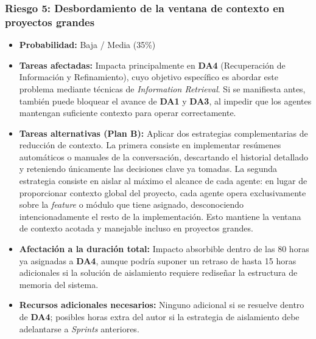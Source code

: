 \documentclass[11pt, letterpaper]{article}
\begin{document}
\subsubsection{Riesgo 5: Desbordamiento de la ventana de contexto en proyectos grandes}
\label{sec:riesgo5}
\begin{itemize}
    \item \textbf{Probabilidad:} Baja / Media (35\%)
    \item \textbf{Tareas afectadas:} Impacta principalmente en \textbf{DA4} (Recuperación de Información y Refinamiento), cuyo objetivo específico es abordar este problema mediante técnicas de \textit{Information Retrieval}. Si se manifiesta antes, también puede bloquear el avance de \textbf{DA1} y \textbf{DA3}, al impedir que los agentes mantengan suficiente contexto para operar correctamente.
    \item \textbf{Tareas alternativas (Plan B):} Aplicar dos estrategias complementarias de reducción de contexto. La primera consiste en implementar resúmenes automáticos o manuales de la conversación, descartando el historial detallado y reteniendo únicamente las decisiones clave ya tomadas. La segunda estrategia consiste en aislar al máximo el alcance de cada agente: en lugar de proporcionar contexto global del proyecto, cada agente opera exclusivamente sobre la \textit{feature} o módulo que tiene asignado, desconociendo intencionadamente el resto de la implementación. Esto mantiene la ventana de contexto acotada y manejable incluso en proyectos grandes.
    \item \textbf{Afectación a la duración total:} Impacto absorbible dentro de las 80 horas ya asignadas a \textbf{DA4}, aunque podría suponer un retraso de hasta 15 horas adicionales si la solución de aislamiento requiere rediseñar la estructura de memoria del sistema.
    \item \textbf{Recursos adicionales necesarios:} Ninguno adicional si se resuelve dentro de \textbf{DA4}; posibles horas extra del autor si la estrategia de aislamiento debe adelantarse a \textit{Sprints} anteriores.
\end{itemize}
\end{document}

